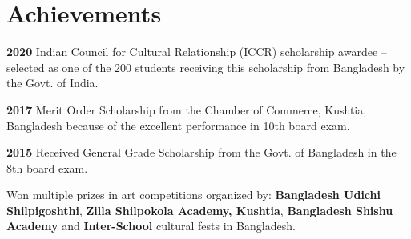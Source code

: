 \documentclass[]{resume-openfont}
\begin{document}
\section{Achievements}
\begin{bullets}
    \item \textbf{2020} Indian Council for Cultural Relationship (ICCR) scholarship awardee – selected as one of the 200 students receiving this scholarship from Bangladesh by the Govt. of India.
    \item \textbf{2017} Merit Order Scholarship from the Chamber of Commerce, Kushtia, Bangladesh because of the excellent performance in 10th board exam.
    \item \textbf{2015} Received General Grade Scholarship from the Govt. of Bangladesh in the 8th board exam.
    \item Won multiple prizes in art competitions organized by: \textbf{Bangladesh Udichi Shilpigoshthi}, \textbf{Zilla Shilpokola Academy, Kushtia}, \textbf{Bangladesh Shishu Academy} and \textbf{Inter-School} cultural fests in Bangladesh.
\end{bullets}
\sectionsep

\end{document}
